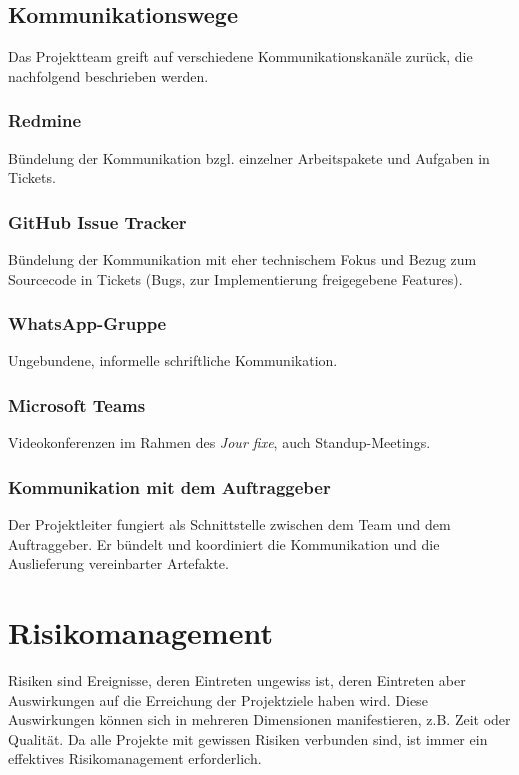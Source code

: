 \documentclass[a4paper,11pt,listof=numbered,glossary=totoc,parskip=half,toc=bib]{scrreprt}
\begin{document}
\section{Kommunikationswege}

Das Projektteam greift auf verschiedene Kommunikationskanäle zurück, die nachfolgend beschrieben werden.

\subsection{Redmine}

Bündelung der Kommunikation bzgl. einzelner Arbeitspakete und Aufgaben in Tickets.

\subsection{GitHub Issue Tracker}

Bündelung der Kommunikation mit eher technischem Fokus und Bezug zum Sourcecode in Tickets (Bugs, zur Implementierung freigegebene Features).

\subsection{WhatsApp-Gruppe}

Ungebundene, informelle schriftliche Kommunikation.

\subsection{Microsoft Teams}

Videokonferenzen im Rahmen des \textit{Jour fixe}, auch Standup-Meetings.

\subsection{Kommunikation mit dem Auftraggeber}

Der Projektleiter fungiert als Schnittstelle zwischen dem Team und dem Auftraggeber. Er bündelt und koordiniert die Kommunikation und die Auslieferung vereinbarter Artefakte.

	\newpage
	\chapter{Risikomanagement}

Risiken sind Ereignisse, deren Eintreten ungewiss ist, deren Eintreten aber Auswirkungen auf die Erreichung der Projektziele haben wird. Diese Auswirkungen können sich in mehreren Dimensionen manifestieren, z.B. Zeit oder Qualität. Da alle Projekte mit gewissen Risiken verbunden sind, ist immer ein effektives Risikomanagement erforderlich. 
\end{document}
